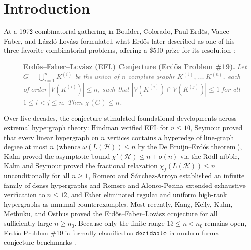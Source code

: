 \documentclass[11pt,reqno]{amsart}
\theoremstyle{definition}
\theoremstyle{remark}
\begin{document}
\maketitle

\section{Introduction}

At a 1972 combinatorial gathering in Boulder, Colorado, Paul Erd\H{o}s, Vance Faber, and L\'aszl\'o Lov\'asz formulated what Erd\H{o}s later described as one of his three favorite combinatorial problems, offering a \$500 prize for its resolution \cite{Erdos1981}:
\begin{quote}
\textbf{Erd\H{o}s--Faber--Lov\'asz (EFL) Conjecture (Erd\H{o}s Problem \#19).} \emph{Let $G = \bigcup_{i=1}^n K^{(i)}$ be the union of $n$ complete graphs $K^{(1)}, \dots, K^{(n)}$, each of order $|V(K^{(i)})| \le n$, such that $|V(K^{(i)}) \cap V(K^{(j)})| \le 1$ for all $1 \le i < j \le n$. Then $\chi(G) \le n$.}
\end{quote}

Over five decades, the conjecture stimulated foundational developments across extremal hypergraph theory: Hindman \cite{Hindman1981} verified EFL for $n \le 10$, Seymour \cite{Seymour1982} proved that every linear hypergraph on $n$ vertices contains a hyperedge of line-graph degree at most $n$ (whence $\omega(L(\mathcal{H})) \le n$ by the De Bruijn--Erd\H{o}s theorem \cite{DeBruijnErdos1948}), Kahn \cite{Kahn1992} proved the asymptotic bound $\chi'(\mathcal{H}) \le n + o(n)$ via the R\"odl nibble, Kahn and Seymour \cite{KahnSeymour1992} proved the fractional relaxation $\chi_f(L(\mathcal{H})) \le n$ unconditionally for all $n \ge 1$, Romero and S\'anchez-Arroyo \cite{RomeroSanchezArroyo2007} established an infinite family of dense hypergraphs and Romero and Alonso-Pecina \cite{RomeroAlonsoPecina2014} extended exhaustive verification to $n \le 12$, and Faber \cite{Faber2010} eliminated regular and uniform high-rank hypergraphs as minimal counterexamples. Most recently, Kang, Kelly, K\"uhn, Methuku, and Osthus \cite{KKKMO2024} proved the Erd\H{o}s--Faber--Lov\'asz conjecture for all sufficiently large $n \ge n_0$. Because only the finite range $13 \le n < n_0$ remains open, Erd\H{o}s Problem \#19 is formally classified as \texttt{decidable} in modern formal-conjecture benchmarks \cite{Kassis2026}.
\end{document}
